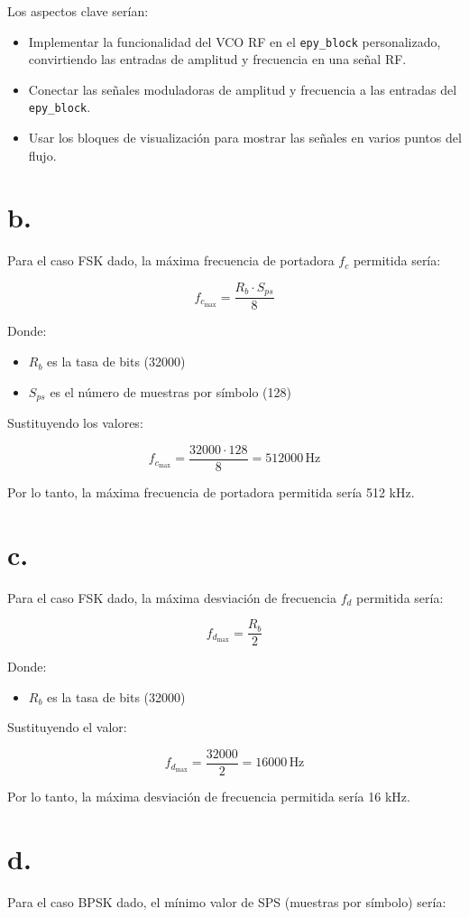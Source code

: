 \documentclass{journal}[IEEEtran, twocolumn]             %
\begin{document}
\begin{multicols}{2}
{Los aspectos clave serían:
\begin{itemize}
    \item Implementar la funcionalidad del VCO RF en el \texttt{epy\_block} personalizado, convirtiendo las entradas de amplitud y frecuencia en una señal RF.
    \item Conectar las señales moduladoras de amplitud y frecuencia a las entradas del \texttt{epy\_block}.
    \item Usar los bloques de visualización para mostrar las señales en varios puntos del flujo.
\end{itemize}

\section*{b.}
Para el caso FSK dado, la máxima frecuencia de portadora $f_c$ permitida sería:

\[
f_{c_{\text{max}}} = \frac{R_b \cdot S_{ps}}{8}
\]

Donde:
\begin{itemize}
    \item $R_b$ es la tasa de bits (32000)
    \item $S_{ps}$ es el número de muestras por símbolo (128)
\end{itemize}

Sustituyendo los valores:

\[
f_{c_{\text{max}}} = \frac{32000 \cdot 128}{8} = 512000 \, \text{Hz}
\]

Por lo tanto, la máxima frecuencia de portadora permitida sería 512 kHz.

\section*{c.}
Para el caso FSK dado, la máxima desviación de frecuencia $f_d$ permitida sería:

\[
f_{d_{\text{max}}} = \frac{R_b}{2}
\]

Donde:
\begin{itemize}
    \item $R_b$ es la tasa de bits (32000)
\end{itemize}

Sustituyendo el valor:

\[
f_{d_{\text{max}}} = \frac{32000}{2} = 16000 \, \text{Hz}
\]

Por lo tanto, la máxima desviación de frecuencia permitida sería 16 kHz.

\section*{d.}
Para el caso BPSK dado, el mínimo valor de SPS (muestras por símbolo) sería:

}
\end{multicols}
\end{document}
